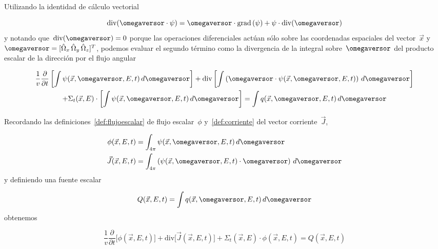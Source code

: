 Utilizando la identidad de cálculo vectorial

\begin{equation*}
 \text{div}(\omegaversor \cdot \psi ) = \omegaversor \cdot \text{grad} \left( \psi \right) + \psi \cdot \text{div} ( \omegaversor ) 
\end{equation*}
%
y notando que~$\text{div} ( \omegaversor ) = 0$ porque las operaciones diferenciales actúan sólo sobre las coordenadas espaciales del vector~$\vec{x}$ y~$\omegaversor = [ \hat{\Omega}_x \, \hat{\Omega}_y \, \hat{\Omega}_z]^T$, podemos evaluar el segundo término como la divergencia de la integral sobre~$\omegaversor$ del producto escalar de la dirección por el flujo angular

\begin{multline*}
 \frac{1}{v} \frac{\partial}{\partial t} \left[ \int \psi(\vec{x}, \omegaversor, E, t) \, d\omegaversor \right]
 + \text{div} \left [ \int \left( \omegaversor  \cdot \psi(\vec{x}, \omegaversor, E, t)\right)\, d\omegaversor \right] \\
 + \Sigma_t(\vec{x}, E) \cdot \left[ \int \psi(\vec{x}, \omegaversor, E, t) \, d\omegaversor \right]
 = \int q(\vec{x}, \omegaversor, E, t) \, d\omegaversor
\end{multline*}
%

\medskip

Recordando las definiciones~\ref{def:flujoescalar} de flujo escalar~$\phi$ y~\ref{def:corriente} del vector corriente~$\vec{J}$,

\begin{align*}
\phi(\vec{x}, E, t) &= \int_{4\pi} \psi(\vec{x}, \omegaversor, E, t) \, d\omegaversor  \\
\vec{J}(\vec{x},E,t) &= \int_{4\pi} \left( \psi(\vec{x}, \omegaversor, E, t) \cdot \omegaversor \right) \, d\omegaversor
\end{align*}
% 
y definiendo una fuente escalar

\begin{equation}
\label{eq:Qgrande}
 Q(\vec{x}, E, t) = \int q(\vec{x}, \omegaversor, E, t) \, d\omegaversor
\end{equation}
%
obtenemos

\begin{equation}
\label{eq:conservacion}
 \frac{1}{v} \frac{\partial}{\partial t} \Big[ \phi(\vec{x}, E, t) \Big]
 + \text{div} \Big[ \vec{J}(\vec{x}, E, t) \Big]
 + \Sigma_t(\vec{x}, E) \cdot \phi(\vec{x}, E, t)
 = Q(\vec{x}, E, t) 
\end{equation}

